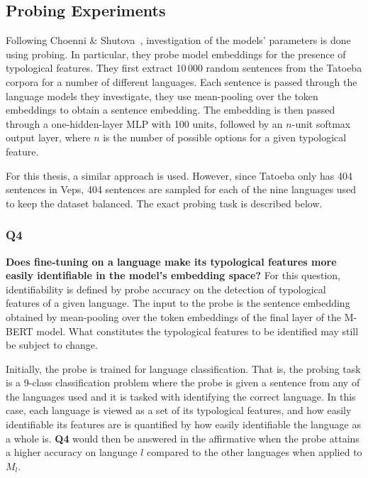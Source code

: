 	\subsection{Probing Experiments}
	\label{sub:probing}
		Following Choenni \& Shutova~\cite{choenni-shutova-2022-investigating}, investigation of the models' parameters is done using probing. In particular, they probe model embeddings for the presence of typological features. They first extract 10\,000 random sentences from the Tatoeba corpora for a number of different languages. Each sentence is passed through the language models they investigate, they use mean-pooling over the token embeddings to obtain a sentence embedding. The embedding is then passed through a one-hidden-layer MLP with 100 units, followed by an $n$-unit softmax output layer, where $n$ is the number of possible options for a given typological feature.

		For this thesis, a similar approach is used. However, since Tatoeba only has 404 sentences in Veps, 404 sentences are sampled for each of the nine languages used to keep the dataset balanced. The exact probing task is described below.

		\subsubsection{Q4}
		\textbf{Does fine-tuning on a language make its typological features more easily identifiable in the model's embedding space?}
			For this question, identifiability is defined by probe accuracy on the detection of typological features of a given language. The input to the probe is the sentence embedding obtained by mean-pooling over the token embeddings of the final layer of the M-BERT model. What constitutes the typological features to be identified may still be subject to change.

			Initially, the probe is trained for language classification. That is, the probing task is a 9-class classification problem where the probe is given a sentence from any of the languages used and it is tasked with identifying the correct language. In this case, each language is viewed as a set of its typological features, and how easily identifiable its features are is quantified by how easily identifiable the language as a whole is. \textbf{Q4} would then be answered in the affirmative when the probe attains a higher accuracy on language $l$ compared to the other languages when applied to $M_l$.

